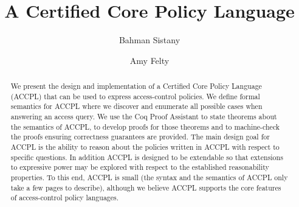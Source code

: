 \documentclass[runningheads,a4paper]{llncs}
\begin{document}


\title{A Certified Core Policy Language}

\author{Bahman Sistany \and Amy Felty}

%
\iffalse
\author{Firstname Lastname\inst{1} \and Firstname Lastname\inst{2} }

\institute{
Insitute 1\\
\email{...}\and
Insitute 2\\
\email{...}
}
\fi
			
\maketitle

\begin{abstract}
We present the design and implementation of a Certified Core Policy Language (ACCPL) that can be used to express access-control policies. We define formal semantics for ACCPL where we discover and enumerate all possible cases when answering an access query. We use the Coq Proof Assistant to state theorems about the semantics of ACCPL, to develop proofs for those theorems and to machine-check the proofs ensuring correctness guarantees are provided. The main design goal for ACCPL is the ability to reason about the policies written in ACCPL with respect to specific questions. In addition ACCPL is designed to be extendable so that extensions to expressive power may be explored with respect to the established reasonability properties.  To this end, ACCPL is small (the syntax and the semantics of ACCPL only take a few pages to describe), although we believe ACCPL supports the core features of access-control policy languages.
\end{abstract}
\end{document}
